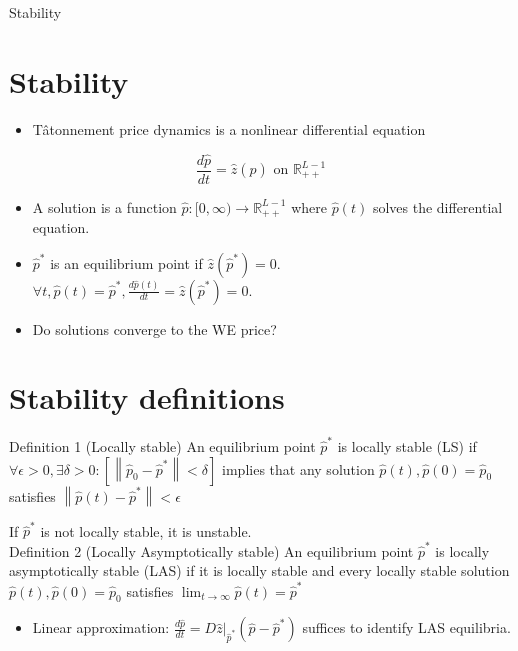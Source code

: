 \documentclass[10pt]{article}
\begin{document}
Stability

\section*{Stability}
\begin{itemize}
  \item Tâtonnement price dynamics is a nonlinear differential equation
\end{itemize}

$$
\frac{d \hat{p}}{d t}=\hat{z}(\hat{p}) \text { on } \mathbb{R}_{++}^{L-1}
$$

\begin{itemize}
  \item A solution is a function $\hat{p}:[0, \infty) \rightarrow \mathbb{R}_{++}^{L-1}$ where $\hat{p}(t)$ solves the differential equation.
  \item $\hat{p}^{*}$ is an equilibrium point if $\hat{z}\left(\hat{p}^{*}\right)=0$.\\
$\forall t, \hat{p}(t)=\hat{p}^{*}, \frac{d \hat{p}(t)}{d t}=\hat{z}\left(\hat{p}^{*}\right)=0$.
  \item Do solutions converge to the WE price?
\end{itemize}

\section*{Stability definitions}
Definition 1 (Locally stable) An equilibrium point $\hat{p}^{*}$ is locally stable (LS) if $\forall \epsilon>0, \exists \delta>0:\left[\left\|\hat{p}_{0}-\hat{p}^{*}\right\|<\delta\right]$ implies that any solution $\hat{p}(t), \hat{p}(0) =\hat{p}_{0}$ satisfies $\left\|\hat{p}(t)-\hat{p}^{*}\right\|<\epsilon$

If $\hat{p}^{*}$ is not locally stable, it is unstable.\\
Definition 2 (Locally Asymptotically stable) An equilibrium point $\hat{p}^{*}$ is locally asymptotically stable (LAS) if it is locally stable and every locally stable solution $\hat{p}(t), \hat{p}(0)=\hat{p}_{0}$ satisfies $\lim _{t \rightarrow \infty} \hat{p}(t)=\hat{p}^{*}$

\begin{itemize}
  \item Linear approximation: $\frac{d \hat{p}}{d t}=\left.D \hat{z}\right|_{\hat{p}^{*}}\left(\hat{p}-\hat{p}^{*}\right)$ suffices to identify LAS equilibria.
\end{itemize}
\end{document}
